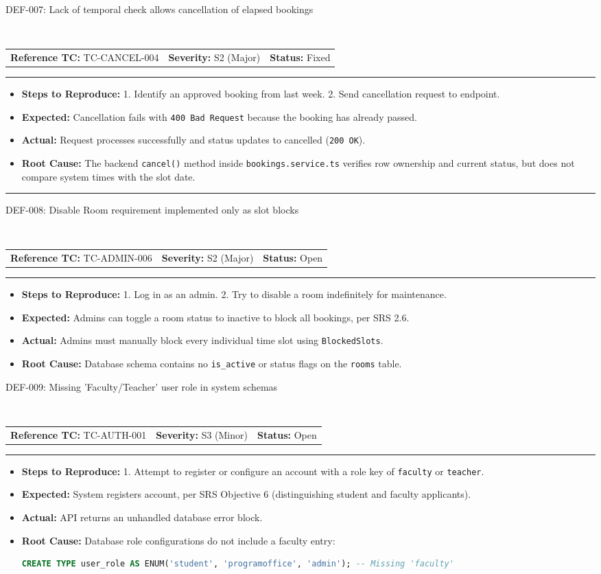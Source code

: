 \documentclass[11pt,a4paper]{article}
\makeatletter
\newcommand{\defectheader}[5]{%
    \needspace{6\baselineskip}
    \noindent\colorbox{primaryblue}{\parbox{\dimexpr\textwidth-2\fboxsep\relax}{
        \color{white}\bfseries\large\strut #1: #2
    }}
    \nopagebreak\\
    \noindent\begin{tabularx}{\textwidth}{@{}X X X@{}}
        \textbf{Reference TC:} #3 & \textbf{Severity:} #4 & \textbf{Status:} #5 \\
    \end{tabularx}
    \nopagebreak\vspace{0.1cm}
    \nopagebreak\hrule\vspace{0.2cm}
}
\makeatother
\begin{document}
\defectheader{DEF-007}{Lack of temporal check allows cancellation of elapsed bookings}{TC-CANCEL-004}{S2 (Major)}{Fixed}
\begin{itemize}[noitemsep,topsep=1pt,leftmargin=0.5cm]
    \item \textbf{Steps to Reproduce:} 
    1. Identify an approved booking from last week. 2. Send cancellation request to endpoint.
    \item \textbf{Expected:} Cancellation fails with \texttt{400 Bad Request} because the booking has already passed.
    \item \textbf{Actual:} Request processes successfully and status updates to cancelled (\texttt{200 OK}).
    \item \textbf{Root Cause:} The backend \texttt{cancel()} method inside \texttt{bookings.service.ts} verifies row ownership and current status, but does not compare system times with the slot date.
\end{itemize}

\vspace{0.4cm}\hrule\vspace{0.4cm}

\defectheader{DEF-008}{Disable Room requirement implemented only as slot blocks}{TC-ADMIN-006}{S2 (Major)}{Open}
\begin{itemize}[noitemsep,topsep=1pt,leftmargin=0.5cm]
    \item \textbf{Steps to Reproduce:} 
    1. Log in as an admin. 2. Try to disable a room indefinitely for maintenance.
    \item \textbf{Expected:} Admins can toggle a room status to inactive to block all bookings, per SRS 2.6.
    \item \textbf{Actual:} Admins must manually block every individual time slot using \texttt{BlockedSlots}.
    \item \textbf{Root Cause:} Database schema contains no \texttt{is\_active} or status flags on the \texttt{rooms} table.
\end{itemize}

\newpage

\defectheader{DEF-009}{Missing 'Faculty/Teacher' user role in system schemas}{TC-AUTH-001}{S3 (Minor)}{Open}
\begin{itemize}[noitemsep,topsep=1pt,leftmargin=0.5cm]
    \item \textbf{Steps to Reproduce:} 
    1. Attempt to register or configure an account with a role key of \texttt{faculty} or \texttt{teacher}.
    \item \textbf{Expected:} System registers account, per SRS Objective 6 (distinguishing student and faculty applicants).
    \item \textbf{Actual:} API returns an unhandled database error block.
    \item \textbf{Root Cause:} Database role configurations do not include a faculty entry:
    \begin{lstlisting}[language=SQL]
    CREATE TYPE user_role AS ENUM('student', 'programoffice', 'admin'); -- Missing 'faculty'
    \end{lstlisting}
\end{itemize}
\end{document}
